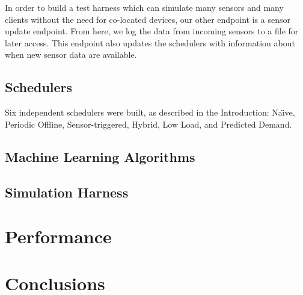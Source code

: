 \documentclass[a4paper]{article}
\begin{document}
In order to build a test harness which can simulate many sensors and many clients without the need for co-located devices, our other endpoint is a sensor update endpoint.  From here, we log the data from incoming sensors to a file for later access.  This endpoint also updates the schedulers with information about when new sensor data are available.

\subsection{Schedulers}

Six independent schedulers were built, as described in the Introduction: Na\"{\i}ve, Periodic Offline, Sensor-triggered, Hybrid, Low Load, and Predicted Demand.

\subsection{Machine Learning Algorithms}

\subsection{Simulation Harness}

\section{Performance}

\section{Conclusions}



\end{document}
